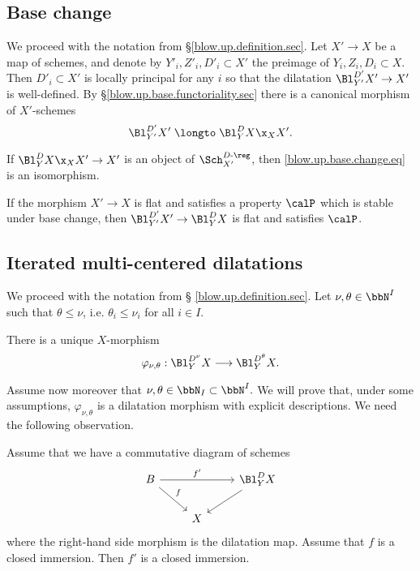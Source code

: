 \documentclass[10pt]{alggeom}
\renewcommand{\leq}{\leqslant}
\theoremstyle{definition}
\numberwithin{equation}{section}
\begin{document}
\subsection{Base change} \label{blow.up.base.change.sec}
We proceed with the notation from \S\ref{blow.up.definition.sec}.
Let $X'\to X$ be a map of schemes, and denote by $Y'_i, Z'_i, D'_i \subset X'$ the preimage of $Y_i,Z_i,D_i \subset X$.
Then $D'_i \subset X'$ is locally principal for any $i$ so that the dilatation $\Bl_{Y'}^{D'}X'\to X'$ is well-defined. 
By \S\ref{blow.up.base.functoriality.sec} there is a canonical morphism of $X'$-schemes
\begin{equation}\label{blow.up.base.change.eq}
\Bl_{Y'}^{D'}X'\;\longto\; \Bl_Y^DX\x_{X}X'.
\end{equation}

\label{blow.up.base.change.lemm}
If $\Bl_Y^DX\x_{X}X'\to X'$ is an object of $\Sch_{X'}^{D\text{-}\reg}$, then \eqref{blow.up.base.change.eq} is an isomorphism.
\xlemm



 \label{blow.up.base.change.cor}
If the morphism $X'\to X$ is flat and satisfies a property $\calP$ which is
stable under base change, then $\Bl_{Y'}^{D'}X'\to\Bl_{Y}^{D}X$ is flat
and satisfies $\calP$.
\xcoro







\subsection{Iterated multi-centered dilatations} \label{sec4}
We proceed with the notation from § \ref{blow.up.definition.sec}. Let $\nu , \theta \in \bbN ^I$ such that $\theta \leq \nu$, i.e. $\theta _i \leq \nu _i $ for all $i\in I$.

\prop[{\cite{Ma23d}}] \label{prop1iter}
There is a unique $X$-morphism 
\[ \varphi _{\nu , \theta}: \Bl _{Y}^{D^{\nu}} X \longrightarrow \Bl _{Y}^{D^{\theta}} X  . \]
\xprop

Assume now moreover that $\nu , \theta \in \bbN _I \subset \bbN ^I.$
We will prove that, under some assumptions, $\varphi _{\nu , \theta}$ is a dilatation morphism with explicit descriptions. We need the following observation.

 \label{liftclo}  Assume that we have a commutative diagram of schemes \[
\begin{tikzcd}B \ar[rr, "f'"] \ar[dr,"f"]  & & \Bl_Y^D X \ar[dl, ] \\  &X \end{tikzcd}\] where the right-hand side morphism is the dilatation map.
 Assume that $f$ is a closed immersion. Then $f'$ is a closed immersion.
\xprop
\end{document}
